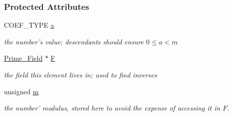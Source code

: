 \subsubsection*{Protected Attributes}
\begin{DoxyCompactItemize}
\item 
\mbox{\label{group___fields_group_a0d7ddb9f8693a8b06c49157632384771}} 
C\+O\+E\+F\+\_\+\+T\+Y\+PE \hyperlink{group___fields_group_a0d7ddb9f8693a8b06c49157632384771}{a}
\begin{DoxyCompactList}\small\item\em the number's value; descendants should ensure $0\leq a<m$ \end{DoxyCompactList}\item 
\mbox{\label{group___fields_group_ac727e179ad217f1672e7011e87fe4b51}} 
\hyperlink{group___fields_group_class_prime___field}{Prime\+\_\+\+Field} $\ast$ \hyperlink{group___fields_group_ac727e179ad217f1672e7011e87fe4b51}{F}
\begin{DoxyCompactList}\small\item\em the field this element lives in; used to find inverses \end{DoxyCompactList}\item 
\mbox{\label{group___fields_group_a0aa08b53ecfdda7a777155758e6b0edc}} 
unsigned \hyperlink{group___fields_group_a0aa08b53ecfdda7a777155758e6b0edc}{m}
\begin{DoxyCompactList}\small\item\em the number' modulus, stored here to avoid the expense of accessing it in $F$. \end{DoxyCompactList}\end{DoxyCompactItemize}
